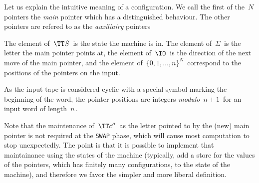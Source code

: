 Let us explain the intuitive meaning of a configuration. We call the first of the $\,N\,$ pointers the \emph{main} pointer which has a distinguished behaviour.
The other pointers are refered to as the \emph{auxiliairy} pointers

The element of $\,\TT S\,$ is the state the machine is in.
The element of $\,\Sigma\,$ is the letter the main pointer points at, the element of $\,\IO\,$ is the direction of the next move of the main pointer, and the element of $\,\{0,1,\dots,n\}^N\,$ correspond to the positions of the pointers on the input.

\smallskip
As the input tape is considered cyclic with a special symbol marking the beginning of the word, the pointer positions are integers \emph{modulo} $\,n+1\,$ for an input word of length $\,n\,$.


Note that the maintenance of $\,\TT c''\,$ as the letter pointed to by the (new) main pointer is not required at the \texttt{SWAP} phase, which will cause most computation to stop unexpectedly.
The point is that it is possible to implement that maintainance using the states of the machine (typically, add a store for the values of the pointers, which has finitely many configurations, to the state of the machine), and therefore we favor the simpler and more liberal definition.


